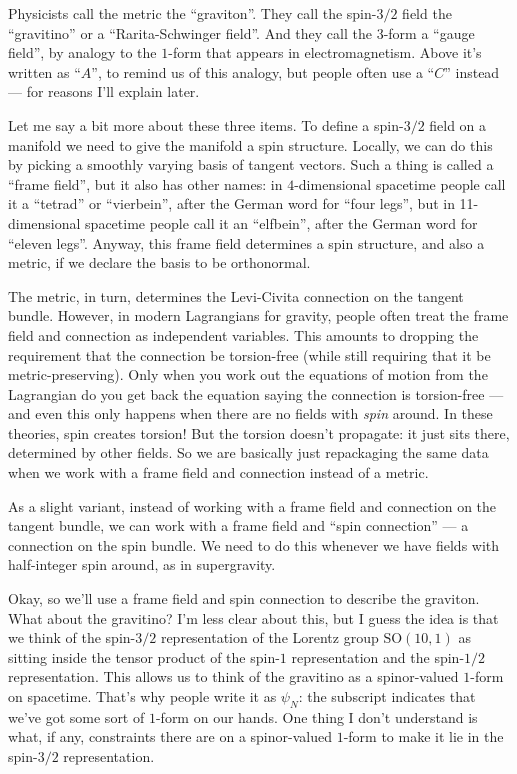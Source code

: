 \documentclass{article}
\begin{document}
Physicists call the metric the ``graviton''. They call the spin-\(3/2\)
field the ``gravitino'' or a ``Rarita-Schwinger field''. And they call
the \(3\)-form a ``gauge field'', by analogy to the \(1\)-form that
appears in electromagnetism. Above it's written as ``\(A\)'', to remind
us of this analogy, but people often use a ``\(C\)'' instead --- for
reasons I'll explain later.

Let me say a bit more about these three items. To define a spin-\(3/2\)
field on a manifold we need to give the manifold a spin structure.
Locally, we can do this by picking a smoothly varying basis of tangent
vectors. Such a thing is called a ``frame field'', but it also has other
names: in \(4\)-dimensional spacetime people call it a ``tetrad'' or
``vierbein'', after the German word for ``four legs'', but in
11-dimensional spacetime people call it an ``elfbein'', after the German
word for ``eleven legs''. Anyway, this frame field determines a spin
structure, and also a metric, if we declare the basis to be orthonormal.

The metric, in turn, determines the Levi-Civita connection on the
tangent bundle. However, in modern Lagrangians for gravity, people often
treat the frame field and connection as independent variables. This
amounts to dropping the requirement that the connection be torsion-free
(while still requiring that it be metric-preserving). Only when you work
out the equations of motion from the Lagrangian do you get back the
equation saying the connection is torsion-free --- and even this only
happens when there are no fields with \emph{spin} around. In these
theories, spin creates torsion! But the torsion doesn't propagate: it
just sits there, determined by other fields. So we are basically just
repackaging the same data when we work with a frame field and connection
instead of a metric.

As a slight variant, instead of working with a frame field and
connection on the tangent bundle, we can work with a frame field and
``spin connection'' --- a connection on the spin bundle. We need to do
this whenever we have fields with half-integer spin around, as in
supergravity.

Okay, so we'll use a frame field and spin connection to describe the
graviton. What about the gravitino? I'm less clear about this, but I
guess the idea is that we think of the spin-\(3/2\) representation of
the Lorentz group \(\mathrm{SO}(10,1)\) as sitting inside the tensor
product of the spin-\(1\) representation and the spin-\(1/2\)
representation. This allows us to think of the gravitino as a
spinor-valued \(1\)-form on spacetime. That's why people write it as
\(\psi_N\): the subscript indicates that we've got some sort of
\(1\)-form on our hands. One thing I don't understand is what, if any,
constraints there are on a spinor-valued \(1\)-form to make it lie in
the spin-\(3/2\) representation.
\end{document}
